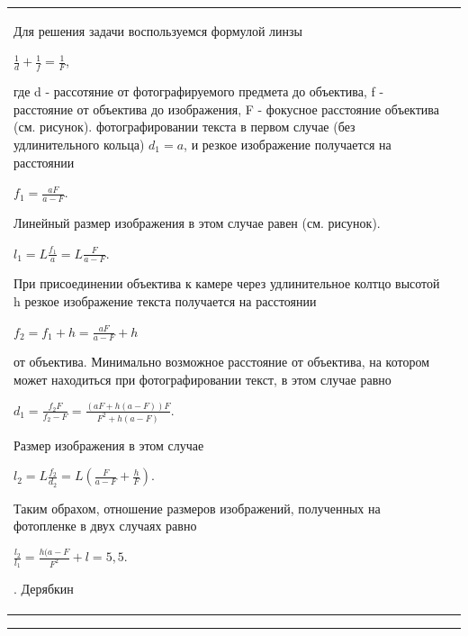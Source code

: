 \begin{tabular}{p{}p{}}
        Для решения задачи воспользуемся формулой линзы
        \begin{center}
            $\frac{1}{d} + \frac{1}{f} = \frac{1}{F}$,
        \end{center}
        где d - рассотяние от фотографируемого предмета до объектива, f - расстояние от объектива до изображения, F - фокусное расстояние объектива (см. рисунок).\newline
        \null{} фотографировании текста в первом случае (без удлинительного кольца) $d_{1}=a$, и резкое изображение получается на расстоянии %
        \begin{center}
            $f_{1}=\frac{aF}{a-F}$.
        \end{center}
        Линейный размер изображения в этом случае равен (см. рисунок).
        \begin{center}
            $l_{1} = L\frac{f_{1}}{a} = L\frac{F}{a-F}$.
        \end{center}
        \quad При присоединении объектива к камере через удлинительное колтцо высотой h резкое изображение текста получается на расстоянии
        \begin{center}
            $f_{2}=f_{1}+h=\frac{aF}{a-F}+h$
        \end{center}
        от объектива. Минимально возможное расстояние от объектива, на котором может находиться при фотографировании текст, в этом случае равно
        \begin{center}
            $d_{1}=\frac{f_{2}F}{f_{2}-F}=\frac{(aF+h(a-F))F}{F^{2}+h(a-F)}$.
        \end{center}
        Размер изображения в этом случае
        \begin{center}
            $l_{2}=L\frac{f_{2}}{d_{2}}=L(\frac{F}{a-F}+\frac{h}{F})$.
        \end{center}
        \quad Таким обрахом, отношение размеров изображений, полученных на фотопленке в двух случаях равно
        \begin{center}
            $\frac{l_{2}}{l_{1}}=\frac{h(a-F}{F^{2}}+l=5,5$.
        \end{center}
        \begin{flushright}
            . Дерябкин
        \end{flushright}
        \\
    \end{tabular}

    \hrule

